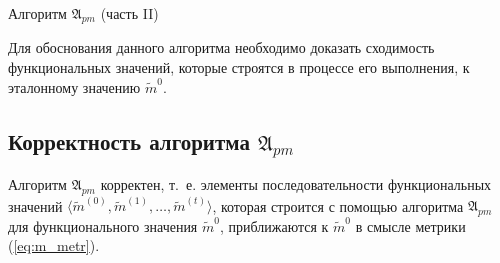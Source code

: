 \begin{algorithm}[h]
	\caption{Алгоритм $\mathfrak{A}_{pm}$ (часть II)}
	\label{alg:cycle_pm_end}
	\begin{algorithmic}[1]
		
	\end{algorithmic}
\end{algorithm}

Для обоснования данного алгоритма необходимо доказать сходимость функциональных значений, которые строятся в процессе его выполнения, к эталонному значению $\tilde m^0$.


\subsection{Корректность алгоритма $\mathfrak A_{pm}$} \label{sect3_4}

\begin{Theorem}
	Алгоритм $\mathfrak A_{pm}$ корректен, т.~е. элементы последовательности функциональных значений $\langle\tilde m^{(0)},\tilde m^{(1)},\dots,\tilde m^{(t)}\rangle$, которая строится с помощью алгоритма $\mathfrak A_{pm}$ для функционального значения $\tilde m^0$, приближаются к $\tilde m^0$ в смысле метрики (\ref{eq:m_metr}).
\end{Theorem}

